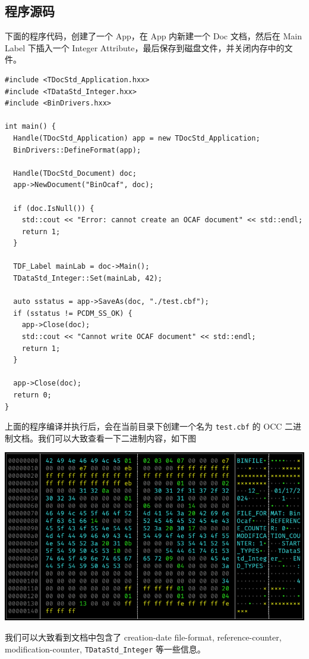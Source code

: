 \documentclass[11pt]{article}
\begin{document}
\subsection{程序源码}
\label{sec:org41d8e45}

下面的程序代码，创建了一个 App，在 App 内新建一个 Doc 文档，然后在 Main Label 下插入一个 Integer Attribute，最后保存到磁盘文件，并关闭内存中的文件。

\begin{verbatim}
#include <TDocStd_Application.hxx>
#include <TDataStd_Integer.hxx>
#include <BinDrivers.hxx>

int main() {
  Handle(TDocStd_Application) app = new TDocStd_Application;
  BinDrivers::DefineFormat(app);

  Handle(TDocStd_Document) doc;
  app->NewDocument("BinOcaf", doc);

  if (doc.IsNull()) {
    std::cout << "Error: cannot create an OCAF document" << std::endl;
    return 1;
  }

  TDF_Label mainLab = doc->Main();
  TDataStd_Integer::Set(mainLab, 42);

  auto sstatus = app->SaveAs(doc, "./test.cbf");
  if (sstatus != PCDM_SS_OK) {
    app->Close(doc);
    std::cout << "Cannot write OCAF document" << std::endl;
    return 1;
  }

  app->Close(doc);
  return 0;
}
\end{verbatim}

上面的程序编译并执行后，会在当前目录下创建一个名为 \texttt{test.cbf} 的 OCC 二进制文档。我们可以大致查看一下二进制内容，如下图

\begin{center}
\includegraphics[width=.9\linewidth]{./img/binocaf-binary-content.png}
\end{center}

我们可以大致看到文档中包含了 creation-date file-format, reference-counter, modification-counter, \texttt{TDataStd\_Integer} 等一些信息。
\end{document}
